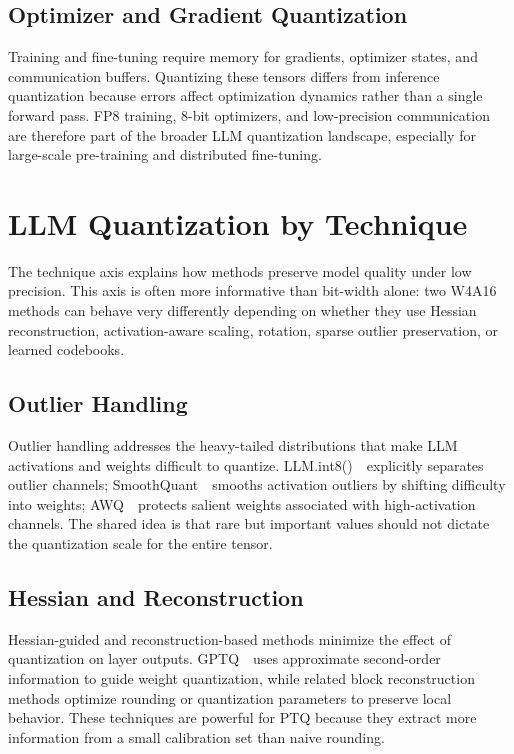 \documentclass[journal,10pt]{IEEEtran}
\begin{document}
\subsection{Optimizer and Gradient Quantization}
Training and fine-tuning require memory for gradients, optimizer states, and communication buffers. Quantizing these tensors differs from inference quantization because errors affect optimization dynamics rather than a single forward pass. FP8 training, 8-bit optimizers, and low-precision communication are therefore part of the broader LLM quantization landscape, especially for large-scale pre-training and distributed fine-tuning.

\section{LLM Quantization by Technique}

The technique axis explains how methods preserve model quality under low precision. This axis is often more informative than bit-width alone: two W4A16 methods can behave very differently depending on whether they use Hessian reconstruction, activation-aware scaling, rotation, sparse outlier preservation, or learned codebooks.

\subsection{Outlier Handling}
Outlier handling addresses the heavy-tailed distributions that make LLM activations and weights difficult to quantize. LLM.int8()~\cite{dettmers2022llmint8}\ explicitly separates outlier channels; SmoothQuant~\cite{xiao2022smoothquant}\ smooths activation outliers by shifting difficulty into weights; AWQ~\cite{lin2023awq}\ protects salient weights associated with high-activation channels. The shared idea is that rare but important values should not dictate the quantization scale for the entire tensor.

\subsection{Hessian and Reconstruction}
Hessian-guided and reconstruction-based methods minimize the effect of quantization on layer outputs. GPTQ~\cite{frantar2022gptq}\ uses approximate second-order information to guide weight quantization, while related block reconstruction methods optimize rounding or quantization parameters to preserve local behavior. These techniques are powerful for PTQ because they extract more information from a small calibration set than naive rounding.
\end{document}
